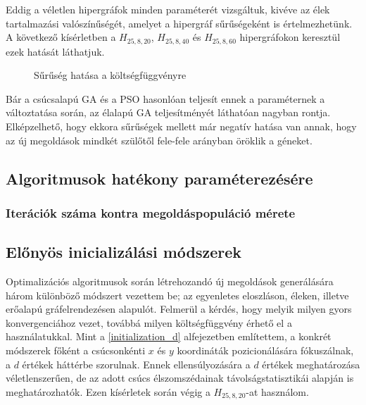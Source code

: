 Eddig a véletlen hipergráfok minden paraméterét vizsgáltuk, kivéve az élek tartalmazási valószínűségét, amelyet a hipergráf sűrűségeként is értelmezhetünk. A következő kísérletben a $H_{25,8,20}$, $H_{25,8,40}$ és $H_{25,8,60}$ hipergráfokon keresztül ezek hatását láthatjuk.

\begin{figure}[H]
	\centering
	\hspace{5pt}
	\hspace{5pt}
	\caption{Sűrűség hatása a költségfüggvényre}
\end{figure}

Bár a csúcsalapú GA és a PSO hasonlóan teljesít ennek a paraméternek a változtatása során, az élalapú GA teljesítményét láthatóan nagyban rontja. Elképzelhető, hogy ekkora sűrűségek mellett már negatív hatása van annak, hogy az új megoldások mindkét szülőtől fele-fele arányban öröklik a géneket.


\subsection{Algoritmusok hatékony paraméterezésére}


\subsubsection{Iterációk száma kontra megoldáspopuláció mérete}


\subsection{Előnyös inicializálási módszerek}

Optimalizációs algoritmusok során létrehozandó új megoldások generálására három különböző módszert vezettem be; az egyenletes eloszláson, éleken, illetve erőalapú gráfelrendezésen alapulót. Felmerül a kérdés, hogy melyik milyen gyors konvergenciához vezet, továbbá milyen költségfüggvény érhető el a használatukkal. Mint a \ref{initialization_d} alfejezetben említettem, a konkrét módszerek főként a csúcsonkénti $x$ és $y$ koordináták pozicionálására fókuszálnak, a $d$ értékek háttérbe szorulnak. Ennek ellensúlyozására a $d$ értékek meghatározása véletlenszerűen, de az adott csúcs élszomszédainak távolságstatisztikái alapján is meghatározhatók. Ezen kísérletek során végig a $H_{25,8,20}$-at használom.

